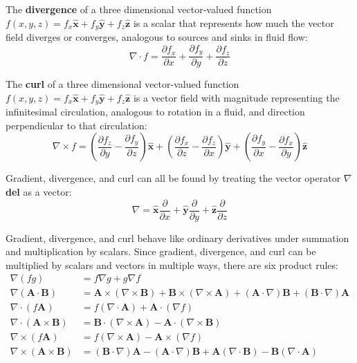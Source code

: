 \documentclass{article}
\begin{document}
\begin{definition}
    The \textbf{divergence} of a three dimensional vector-valued function \(f(x,y,z)=f_x \mathbf{\hat{x}} +f_y \mathbf{\hat{y}} +f_z \mathbf{\hat{z}} \) is a scalar 
    that represents how much the vector field diverges or converges, analogous to sources and sinks in fluid flow:
    \[
        \nabla \cdot f=\frac{\partial f_x}{\partial x}+\frac{\partial f_y}{\partial y}+\frac{\partial f_z}{\partial z}
    \] 
\end{definition}

\begin{definition}
    The \textbf{curl} of a three dimensional vector-valued function \(f(x,y,z)=f_x \mathbf{\hat{x}} +f_y \mathbf{\hat{y}} +f_z \mathbf{\hat{z}} \) is a vector field with 
    magnitude representing the infinitesimal circulation, analogous to rotation in a fluid, and direction perpendicular to that circulation:
    \[
        \nabla \times f = (\frac{\partial f_z}{\partial y}-\frac{\partial f_y}{\partial z})\mathbf{\hat{x}} +(\frac{\partial f_x}{\partial z}-\frac{\partial f_z}{\partial x})\mathbf{\hat{y}}+(\frac{\partial f_y}{\partial x}-\frac{\partial f_x}{\partial y})\mathbf{\hat{z}} 
    \]
\end{definition}

Gradient, divergence, and curl can all be found by treating the vector operator \(\nabla\) \textbf{del} as a vector:
\[
    \nabla = \mathbf{\hat{x}} \frac{\partial}{\partial x}+\mathbf{\hat{y}} \frac{\partial}{\partial y}+\mathbf{\hat{z}} \frac{\partial}{\partial z}
\]

Gradient, divergence, and curl behave like ordinary derivatives under summation and multiplication by scalars. Since  gradient, divergence, and curl can be multiplied by scalars and vectors in multiple ways, there are six product rules:
\begin{align*}
    \nabla(fg)&=f \nabla g+g\nabla f \\
    \nabla(\mathbf{A} \cdot \mathbf{B} )&=\mathbf{A} \times (\nabla \times \mathbf{B} )+\mathbf{B} \times (\nabla \times \mathbf{A} )+(\mathbf{A} \cdot \nabla)\mathbf{B} +(\mathbf{B} \cdot \nabla)\mathbf{A}  \\
    \nabla \cdot (f \mathbf{A} )&=f(\nabla \cdot \mathbf{A} )+\mathbf{A} \cdot (\nabla f) \\
    \nabla \cdot (\mathbf{A} \times \mathbf{B} )&=\mathbf{B} \cdot (\nabla \times \mathbf{A} )-\mathbf{A} \cdot (\nabla \times \mathbf{B} ) \\
    \nabla \times (f \mathbf{A} )&=f(\nabla \times \mathbf{A} )-\mathbf{A} \times (\nabla f) \\
    \nabla \times (\mathbf{A} \times \mathbf{B} )&= (\mathbf{B} \cdot \nabla) \mathbf{A} -(\mathbf{A} \cdot \nabla) \mathbf{B} +\mathbf{A} (\nabla \cdot \mathbf{B} )-\mathbf{B} (\nabla \cdot \mathbf{A} )
\end{align*}
\end{document}
